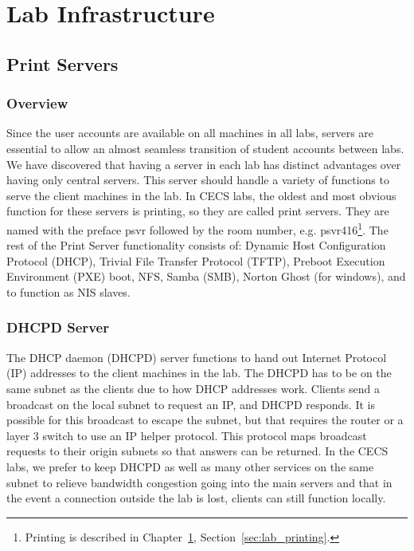 \chapter{Lab Infrastructure} \label{ch:lab_infrastructure}
\section{Print Servers} \label{sec:printservers}
\subsection{Overview}

Since the user accounts are available on all machines in all labs, servers are essential to allow an almost seamless transition of student accounts between labs.  We have discovered that having a server in each lab has distinct advantages over having only central servers.  This server should handle a variety of functions to serve the client machines in the lab.  In CECS labs, the oldest and most obvious function for these servers is printing, so they are called print servers. They are named with the preface psvr followed by the room number, e.g. psvr416\footnote{Printing is described in Chapter~\ref{ch:lab_infrastructure}, Section~\ref{sec:lab_printing}.}.  The rest of the Print Server functionality consists of: Dynamic Host Configuration Protocol (DHCP), Trivial File Transfer Protocol (TFTP), Preboot Execution Environment (PXE) boot, NFS, Samba (SMB), Norton Ghost (for windows), and to function as NIS slaves.  

\subsection{DHCPD Server}

The DHCP daemon (DHCPD) server functions to hand out Internet Protocol (IP) addresses to the client machines in the lab.  The DHCPD has to be on the same subnet as the clients due to how DHCP addresses work.  Clients send a broadcast on the local subnet to request an IP, and DHCPD responds.  It is possible for this broadcast to escape the subnet, but that requires the router or a layer 3 switch to use an IP helper protocol.  This protocol maps broadcast requests to their origin subnets so that answers can be returned.  In the CECS labs, we prefer to keep DHCPD as well as many other services on the same subnet to relieve bandwidth congestion going into the main servers and that in the event a connection outside the lab is lost, clients can still function locally.  

